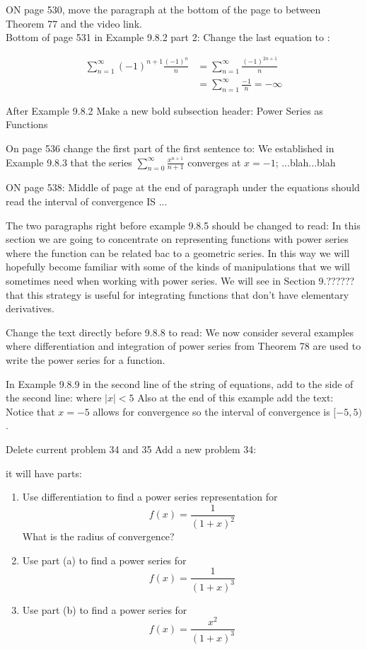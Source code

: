 \documentclass[10pt]{article}
\newcommand{\ds}{\displaystyle}
\begin{document}
ON page 530, move the paragraph at the bottom of the page to between Theorem 77 and the video link.\\

Bottom of page 531 in Example 9.8.2 part 2:  Change the last equation to :

\begin{align*} 
\sum_{n=1}^{\infty} (-1)^{n+1}\frac{(-1)^n}{n} &=\sum_{n=1}^{\infty} \frac{(-1)^{2n+1}}{n}\\
&=\sum_{n=1}^{\infty} \frac{-1}{n}=-\infty
\end{align*}


After Example 9.8.2 Make a new bold subsection header: Power Series as Functions


On page 536 change the first part of the first sentence to:  We established in Example 9.8.3%
 that the series $\ds \sum_{n=0}^{\infty} \frac{x^{n+1}}{n+1}$ converges at $x=-1$; ...blah...blah

ON page 538:  Middle of page at the end of paragraph under the equations should read the interval of convergence IS ...


The two paragraphs right before example 9.8.5 should be changed to read:  In this section we are going to concentrate on representing functions with power series where the function can be related bac to a geometric series. In this way we will hopefully become familiar with some of the kinds of manipulations that we will sometimes need when working with power series. We will see in Section 9.??????%
that this strategy is useful for integrating functions that don't have elementary derivatives.

Change the text directly before 9.8.8 to read:  We now consider several examples where differentiation and integration of power series from Theorem 78 %
are used to write the power series for a function.


In Example 9.8.9 in the second line of the string of equations, add to the side of the second line: where $|x|<5$
	Also at the end of this example add the text:  Notice that $x=-5$ allows for convergence so the interval of convergence is $[-5,5)$.


Delete current problem 34 and 35
Add a new problem 34:

it will have parts: 
\begin{enumerate}[label=(\alph*)]
\item Use differentiation to find a power series representation for $$ f(x)=\frac{1}{(1+x)^2}$$ What is the radius of convergence?
\item Use part (a) to find a power series for $$f(x)=\frac{1}{(1+x)^3}$$
\item Use part (b) to find a power series for $$f(x)=\frac{x^2}{(1+x)^3}$$
\end{enumerate}
\end{document}
